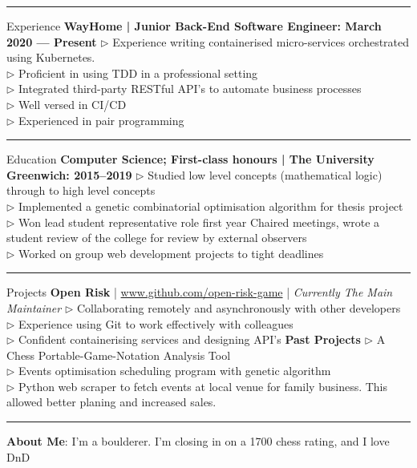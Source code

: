 \documentclass[12pt,twoside]{article}
\begin{document}
\vspace{0.5em}
\hrule
\vspace{0.5em}

\headedsection
    {Experience}
    {
        \textbf{WayHome | Junior Back-End Software Engineer: March 2020 --- Present}}
    {
        $\triangleright$ Experience writing containerised micro-services
        orchestrated using Kubernetes. \\
        $\triangleright$ Proficient in using TDD in a professional setting \\
        $\triangleright$ Integrated third-party RESTful API's to automate business processes \\
        $\triangleright$ Well versed in CI/CD \\
        $\triangleright$ Experienced in pair programming
    }

\vspace{0.5em}
\hrule
\vspace{0.5em}

\headedsection
    {Education}
    {
        \textbf{Computer Science; First-class honours | The University
        Greenwich: 2015--2019}
    }
    {
        $\triangleright$ Studied low level concepts (mathematical logic)
        through to high level concepts \\
        $\triangleright$ Implemented a genetic combinatorial optimisation
        algorithm for thesis project \\
        $\triangleright$ Won lead student representative role first year
        Chaired meetings, wrote a student review of the college for review by
        external observers \\
        $\triangleright$ Worked on group web development projects to tight deadlines
    }

\vspace{0.5em}
\hrule
\vspace{0.5em}

\headedsection
    {Projects}
    {\textbf{Open Risk} | \url{www.github.com/open-risk-game} | \textit{Currently The Main Maintainer}}
    {
        $\triangleright$ Collaborating remotely and asynchronously with other developers \\
        $\triangleright$ Experience using Git to work effectively with colleagues \\
        $\triangleright$ Confident containerising services and designing API's
    }
\headedsection
    {}
    {\textbf{Past Projects}}
    {
        $\triangleright$ A Chess Portable-Game-Notation Analysis Tool \\
        $\triangleright$ Events optimisation scheduling program with genetic algorithm \\
        $\triangleright$ Python web scraper to fetch events at local venue for
        family business. This allowed better planing and increased sales.
    }

\vspace{0.5em}
\hrule
\vspace{0.5em}

\hspace{-1.3em}\textbf{About Me}: I'm a boulderer. I'm closing in on a 1700 chess rating, and I love DnD
\end{document}
